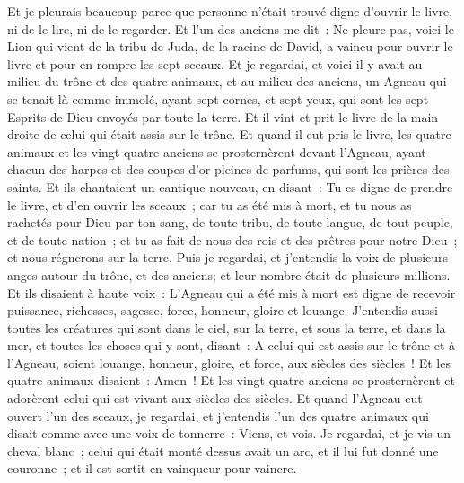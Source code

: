 \begin{multicols}{2}
Et je pleurais beaucoup parce que personne n'était trouvé digne d'ouvrir le livre, ni de le lire, ni de le regarder.
Et l'un des anciens me dit~: Ne pleure pas, voici le Lion qui vient de la tribu de Juda, de la racine de David, a vaincu pour ouvrir le livre et pour en rompre les sept sceaux.
Et je regardai, et voici il y avait au milieu du trône et des quatre animaux, et au milieu des anciens, un Agneau qui se tenait là comme immolé, ayant sept cornes, et sept yeux, qui sont les sept Esprits de Dieu envoyés par toute la terre.
Et il vint et prit le livre de la main droite de celui qui était assis sur le trône.
Et quand il eut pris le livre, les quatre animaux et les vingt-quatre anciens se prosternèrent devant l'Agneau, ayant chacun des harpes et des coupes d'or pleines de parfums, qui sont les prières des saints.
Et ils chantaient un cantique nouveau, en disant~: Tu es digne de prendre le livre, et d'en ouvrir les sceaux~; car tu as été mis à mort, et tu nous as rachetés pour Dieu par ton sang, de toute tribu, de toute langue, de tout peuple, et de toute nation~;
et tu as fait de nous des rois et des prêtres pour notre Dieu~; et nous régnerons sur la terre.
Puis je regardai, et j'entendis la voix de plusieurs anges autour du trône, et des anciens; et leur nombre était de plusieurs millions.
Et ils disaient à haute voix~: L'Agneau qui a été mis à mort est digne de recevoir puissance, richesses, sagesse, force, honneur, gloire et louange.
J'entendis aussi toutes les créatures qui sont dans le ciel, sur la terre, et sous la terre, et dans la mer, et toutes les choses qui y sont, disant~: A celui qui est assis sur le trône et à l'Agneau, soient louange, honneur, gloire, et force, aux siècles des siècles~!
Et les quatre animaux disaient~: Amen~! Et les vingt-quatre anciens se prosternèrent et adorèrent celui qui est vivant aux siècles des siècles.
\VerseOne{}Et quand l'Agneau eut ouvert l'un des sceaux, je regardai, et j'entendis l'un des quatre animaux qui disait comme avec une voix de tonnerre~: Viens, et vois.
Je regardai, et je vis un cheval blanc~; celui qui était monté dessus avait un arc, et il lui fut donné une couronne~; et il est sortit en vainqueur pour vaincre.

\end{multicols}
